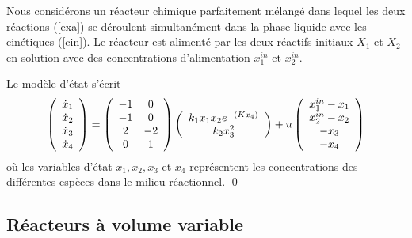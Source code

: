 \begin{exemple}{\blanc} \label{exempleCSTR}

Nous considérons un réacteur chimique parfaitement mélangé dans lequel
les deux réactions (\ref{exa}) se déroulent simultanément dans la
phase liquide avec les cinétiques (\ref{cin}).     Le réacteur est
alimenté par les deux réactifs initiaux $X_1$ et $X_2$ en solution avec des
concentrations d'alimentation
$x_1^{in}$ et $x_2^{in}$.

Le modèle d'état s'écrit
$$
\bma{c} \dot x_1 \\ \dot x_2 \\ \dot x_3 \\ \dot x_4 \ema =
\bma{cc} -1 & 0 \\ -1 & 0 \\ 2 & -2 \\ 0 & 1 \ema \bma{c}
k_1x_1x_2e^{-(Kx_4)} \\ k_2x_3^2 \ema 
 + u \bma{c} x_1^{in} -x_1 \\ x_2^{in} -x_2 \\ -x_3 \\ -x_4
\ema   
$$
où les variables d'état $x_1, x_2, x_3$ et $x_4$ représentent les
concentrations des différentes espèces dans le milieu réactionnel. \qed
\end{exemple}

\subsection{Réacteurs à volume variable}

